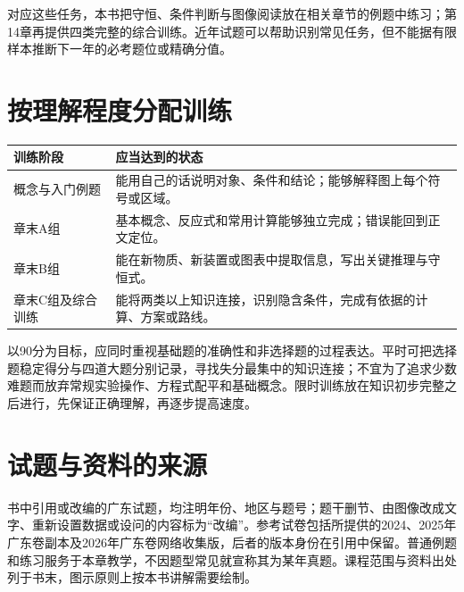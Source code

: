 对应这些任务，本书把守恒、条件判断与图像阅读放在相关章节的例题中练习；第14章再提供四类完整的综合训练。近年试题可以帮助识别常见任务，但不能据有限样本推断下一年的必考题位或精确分值。

\section*{按理解程度分配训练}
\begin{center}
\begin{tabularx}{\linewidth}{p{3.0cm}X}
\toprule
训练阶段 & 应当达到的状态\\
\midrule
概念与入门例题 & 能用自己的话说明对象、条件和结论；能够解释图上每个符号或区域。\\
章末A组 & 基本概念、反应式和常用计算能够独立完成；错误能回到正文定位。\\
章末B组 & 能在新物质、新装置或图表中提取信息，写出关键推理与守恒式。\\
章末C组及综合训练 & 能将两类以上知识连接，识别隐含条件，完成有依据的计算、方案或路线。\\
\bottomrule
\end{tabularx}
\end{center}

以90分为目标，应同时重视基础题的准确性和非选择题的过程表达。平时可把选择题稳定得分与四道大题分别记录，寻找失分最集中的知识连接；不宜为了追求少数难题而放弃常规实验操作、方程式配平和基础概念。限时训练放在知识初步完整之后进行，先保证正确理解，再逐步提高速度。

\section*{试题与资料的来源}
书中引用或改编的广东试题，均注明年份、地区与题号；题干删节、由图像改成文字、重新设置数据或设问的内容标为“改编”。参考试卷包括所提供的2024、2025年广东卷副本及2026年广东卷网络收集版，后者的版本身份在引用中保留。普通例题和练习服务于本章教学，不因题型常见就宣称其为某年真题。课程范围与资料出处列于书末，图示原则上按本书讲解需要绘制。
